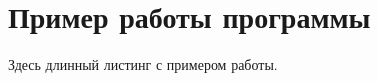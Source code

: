 \printbibliography[heading=bibintoc%
]

\appendix
{}

\section{Пример работы программы}

Здесь длинный листинг с примером работы.


